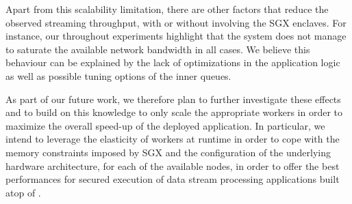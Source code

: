 Apart from this scalability limitation, there are other factors that reduce the observed streaming throughput, with or without involving the SGX enclaves.
For instance, our throughout experiments highlight that the system does not manage to saturate the available network bandwidth in all cases.
We believe this behaviour can be explained by the lack of optimizations in the application logic as well as possible tuning options of the inner \zmq{} queues.

As part of our future work, we therefore plan to further investigate these effects and to build on this knowledge to only scale the appropriate workers in order to maximize the overall speed-up of the deployed application.
In particular, we intend to leverage the elasticity of workers at runtime in order to cope with the memory constraints imposed by SGX and the configuration of the underlying hardware architecture, for each of the available nodes, in order to offer the best performances for secured execution of data stream processing applications built atop of \SYS{}.


